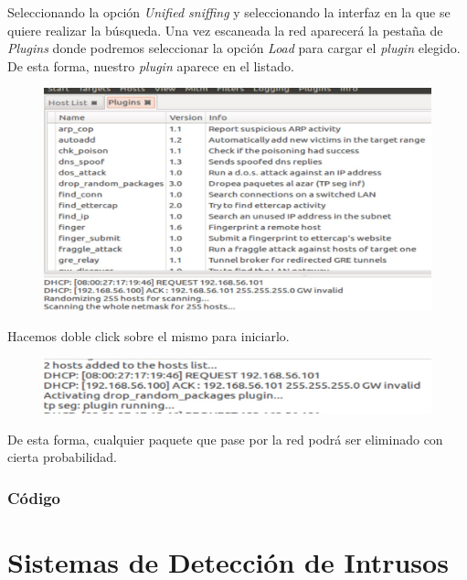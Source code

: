 \documentclass[10pt,a4paper]{article}
\begin{document}
Seleccionando la opción \textit{Unified sniffing} y seleccionando la interfaz en la que se quiere realizar la búsqueda. Una vez escaneada la red aparecerá la pestaña de \textit{Plugins} donde podremos seleccionar la opción \textit{Load} para cargar el \textit{plugin} elegido. De esta forma, nuestro \textit{plugin} aparece en el listado. 
\begin{figure}[H]
\centerline{\includegraphics[scale=1]{images/ettercap_plugins_list.jpg}}
\caption{}
\end{figure}

Hacemos doble click sobre el mismo para iniciarlo.

\begin{figure}[H]
\centerline{\includegraphics[scale=1]{images/ettercap_plugins_started.jpg}}
\caption{}
\end{figure}

De esta forma, cualquier paquete que pase por la red podrá ser eliminado con cierta probabilidad.

\subsubsection{Código}


\pagebreak
\section{Sistemas de Detección de Intrusos}
\end{document}
